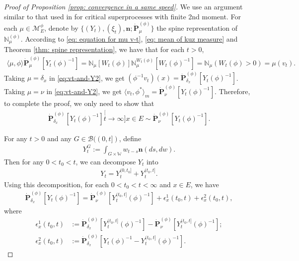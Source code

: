 \documentclass[UTF8]{pkuthss}
\theoremstyle{plain}
\theoremstyle{definition}
\numberwithin{equation}{section}
\begin{document}
\begin{proof}[Proof of Proposition \ref{prop: convergence in a same speed}]
	We use an argument similar to that used in \cite{RenSongSun2019Spine} for critical superprocesses with finite 2nd moment.
	For each $\mu\in\mathcal M^\phi_E$, denote by $\{(Y_t), (\xi_t),\mathbf n; \dot {\mathbf P}^{(\phi)}_\mu\}$ the spine representation of $\mathbb N^{(\phi)}_\mu$.
	According to \eqref	{eq: equation for mu v-t}, \eqref{eq: mean of kuz measure} and Theorem \ref{thm: spine representation},
	we have that for each $t>0$,
\begin{align}\label{eq:vt-and-Y2}
	\langle \mu,\phi \rangle \dot {\mathbf P}^{(\phi)}_\mu [Y_t(\phi)^{-1}]
	= \mathbb N_\mu[W_t(\phi)] \mathbb N^{W_t(\phi)}_\mu [W_t(\phi)^{-1}]
	= \mathbb N_\mu(W_t(\phi) > 0)
	= \mu(v_t).
\end{align}
	Taking $\mu = \delta_x$ in \eqref{eq:vt-and-Y2}, we get $(\phi^{-1}v_t)(x) =\dot{\mathbf P}_{\delta_x}^{(\phi)}[Y_t(\phi)^{-1}]$.
	Taking $\mu = \nu$ in \eqref{eq:vt-and-Y2}, we get $\langle v_t, \phi^*\rangle_m = \dot {\mathbf P}_{\nu}^{(\phi)} [Y_t(\phi)^{-1}]$.
	Therefore, to complete the proof, we only need to show that
\begin{align}
	\dot{\mathbf P}_{\delta_x}^{(\phi)}[Y_t(\phi)^{-1}]
	\stackrel[t\to \infty]{x\in E}{\sim}  \dot {\mathbf P}_\nu^{(\phi)} [Y_t(\phi)^{-1}].
\end{align}

	For any $t>0$ and any $G\in \mathscr B((0,t])$, define
\begin{align}
	Y^G_t
	:= \int_{G\times \mathbb W} w_{t-s} \mathbf n(ds,dw).
\end{align}
	Then for any $0 < t_0 < t$, we can decompose $Y_t$ into
\begin{align}
	Y_t
	= Y^{(0,t_0]}_t + Y^{(t_0,t]}_t.
\end{align}
	Using this decomposition, for each $0<t_0<t<\infty$ and $x\in E$, we have
\begin{align}\label{eq: starting point of phi-1v_t(x)}
	 \dot{\mathbf P}_{\delta_x}^{(\phi)}[Y_t(\phi)^{-1}]
	= \dot {\mathbf P}_\nu^{(\phi)} [Y^{(t_0,t]}_t(\phi)^{-1}] + \epsilon_x^1(t_0,t) +\epsilon_x^2(t_0,t),
\end{align}
	where
\begin{align}
	\epsilon_x^1(t_0,t)
	&:= \dot {\mathbf P}_{\delta_x}^{(\phi)} [Y^{(t_0,t]}_t(\phi)^{-1}] - \dot {\mathbf P}_\nu^{(\phi)} [Y^{(t_0,t]}_t(\phi)^{-1}];
	\\\epsilon_x^2(t_0,t)
	&:= \dot{\mathbf P}_{\delta_x}^{(\phi)}[Y_t(\phi)^{-1} - Y^{(t_0,t]}_t(\phi)^{-1}].
\end{align}


\end{proof}
\end{document}
